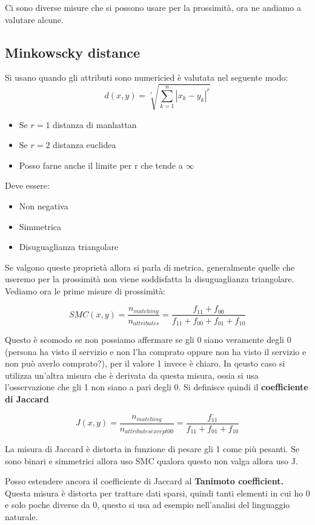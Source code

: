 \documentclass[12pt, a4paper,titlepage,openany]{article}
\begin{document}
Ci sono diverse misure che si possono usare per la prossimità, ora ne andiamo a valutare alcune.

\subsection{Minkowscky distance}

Si usano quando gli attributi sono numericied è valutata nel seguente modo:
\[d(x,y) = \sqrt[r]{\sum_{k = 1}^{n}|x_{k}-y_{k}|^{r}}\]

\begin{itemize}
	\item Se $r = 1$ distanza di manhattan
	\item Se $r = 2$ distanza euclidea
	\item Posso farne anche il limite per r che tende a $\infty$
\end{itemize}

Deve essere:
\begin{itemize}
	\item Non negativa
	\item Simmetrica
	\item Disuguaglianza triangolare
\end{itemize}

Se valgono queste proprietà allora si parla di metrica, generalmente quelle che useremo per la prossimità non viene soddisfatta la disuguaglianza triangolare.
 Vediamo ora le prime misure di prossimità:
 
 \[ SMC(x,y) = \frac{n_{matching}}{n_{attributes}} = \frac{f_{11}+ f_{00}}{f_{11}+ f_{00} + f_{01}+ f_{10}}\]
 
 Questo è scomodo se non possiamo affermare se gli 0 siano veramente degli 0 (persona ha visto il servizio e non l'ha comprato oppure non ha visto il servizio e non può averlo comprato?), per il valore 1 invece è chiaro. In qeusto caso si utilizza un'altra misura che è derivata da questa misura, ossia si usa l'osservazione che gli 1 non siano a pari degli 0. Si definisce quindi il \textbf{coefficiente di Jaccard}
 
  \[ J(x,y) = \frac{n_{matching}}{n_{attributesexcept00}} = \frac{f_{11}}{f_{11}+ f_{01}+ f_{10}}\]
  
 La misura di Jaccard è distorta in funzione di pesare gli 1 come più pesanti. Se sono binari e simmetrici allora uso SMC qualora questo non valga allora uso J.
 
 Posso estendere ancora il coefficiente di Jaccard al \textbf{Tanimoto coefficient.}
 Questa misura è distorta per trattare dati sparsi, quindi tanti elementi in cui ho 0 e solo poche diverse da 0, questo si usa ad esempio nell'analisi del linguaggio naturale.
 
\end{document}
